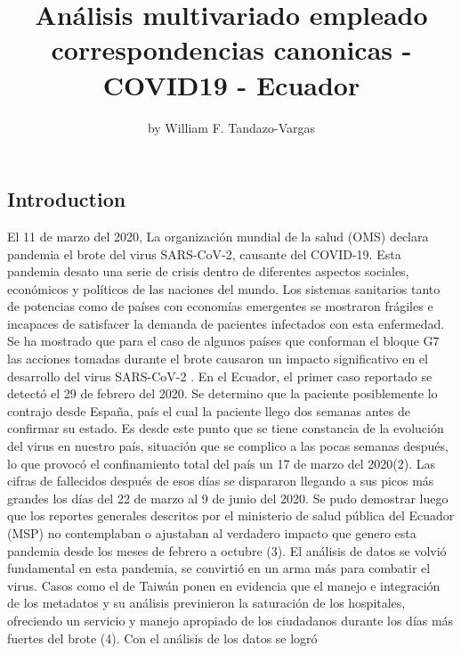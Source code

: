 \title{Análisis multivariado empleado correspondencias canonicas -
COVID19 - Ecuador}
\author{by William F. Tandazo-Vargas}

\maketitle


\hypertarget{introduction}{%
\subsection{Introduction}\label{introduction}}

El 11 de marzo del 2020, La organización mundial de la salud (OMS)
declara pandemia el brote del virus SARS-CoV-2, causante del COVID-19.
Esta pandemia desato una serie de crisis dentro de diferentes aspectos
sociales, económicos y políticos de las naciones del mundo. Los sistemas
sanitarios tanto de potencias como de países con economías emergentes se
mostraron frágiles e incapaces de satisfacer la demanda de pacientes
infectados con esta enfermedad. Se ha mostrado que para el caso de
algunos países que conforman el bloque G7 las acciones tomadas durante
el brote causaron un impacto significativo en el desarrollo del virus
SARS-CoV-2 \citep{ZHANG2020}. En el Ecuador, el primer caso reportado se
detectó el 29 de febrero del 2020. Se determino que la paciente
posiblemente lo contrajo desde España, país el cual la paciente llego
dos semanas antes de confirmar su estado. Es desde este punto que se
tiene constancia de la evolución del virus en nuestro país, situación
que se complico a las pocas semanas después, lo que provocó el
confinamiento total del país un 17 de marzo del 2020(2). Las cifras de
fallecidos después de esos días se dispararon llegando a sus picos más
grandes los días del 22 de marzo al 9 de junio del 2020. Se pudo
demostrar luego que los reportes generales descritos por el ministerio
de salud pública del Ecuador (MSP) no contemplaban o ajustaban al
verdadero impacto que genero esta pandemia desde los meses de febrero a
octubre (3). El análisis de datos se volvió fundamental en esta
pandemia, se convirtió en un arma más para combatir el virus. Casos como
el de Taiwán ponen en evidencia que el manejo e integración de los
metadatos y su análisis previnieron la saturación de los hospitales,
ofreciendo un servicio y manejo apropiado de los ciudadanos durante los
días más fuertes del brote (4). Con el análisis de los datos se logró
